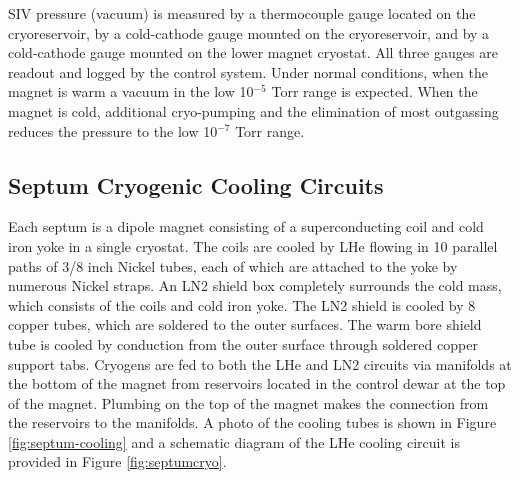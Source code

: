 { SIV pressure (vacuum) is measured by a thermocouple gauge located on the cryoreservoir, 
by a cold-cathode gauge mounted on the cryoreservoir, and by a cold-cathode gauge mounted 
on the lower magnet cryostat. All three gauges are readout and logged by the control system.  
Under normal conditions, when the magnet is warm a vacuum in the low 10$^{-5}$ Torr range is 
expected.  When the magnet is cold, additional cryo-pumping and the elimination of most 
outgassing reduces the pressure to the low 10$^{-7}$ Torr range.

\subsection {\bf Septum Cryogenic Cooling Circuits}
Each septum is a dipole magnet consisting of a superconducting coil and cold iron yoke in 
a single cryostat.  The coils are cooled by LHe flowing in 10 parallel paths of 3/8 inch Nickel 
tubes, each of which are attached to the yoke by numerous Nickel straps. An LN2 shield  box 
completely surrounds the cold mass, which consists of the coils and cold iron yoke.  
The LN2 shield is cooled by 8 copper tubes, which are soldered to the outer surfaces.  
The warm bore shield tube is cooled by conduction from the outer surface through soldered copper 
support tabs. Cryogens are fed to both the LHe and LN2 circuits via manifolds at the bottom of 
the magnet from reservoirs located in the control dewar at the top of the magnet.  Plumbing on 
the top of the magnet makes the connection from the reservoirs to the manifolds.  A photo of the 
cooling tubes is shown in Figure \ref{fig:septum-cooling} and a schematic diagram of the LHe cooling circuit 
is provided in Figure \ref{fig:septumcryo}.
} %


